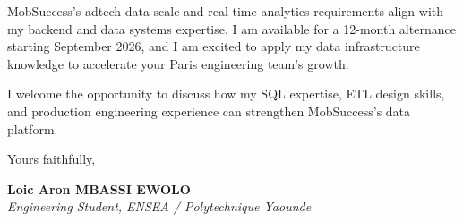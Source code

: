 \documentclass[a4paper,11pt]{article}
\begin{document}
MobSuccess's adtech data scale and real-time analytics requirements align with my backend and data systems expertise. I am available for a 12-month alternance starting September 2026, and I am excited to apply my data infrastructure knowledge to accelerate your Paris engineering team's growth.

I welcome the opportunity to discuss how my SQL expertise, ETL design skills, and production engineering experience can strengthen MobSuccess's data platform.

Yours faithfully,

\vspace{0.8cm}

\textbf{Loic Aron MBASSI EWOLO}\\
\textit{Engineering Student, ENSEA / Polytechnique Yaounde}
\end{document}

